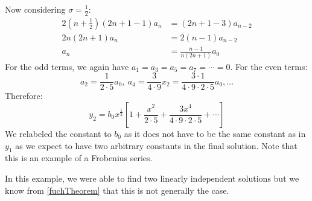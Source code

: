 \documentclass[../main.tex]{subfiles}
\begin{document}
\begin{example}
  Now considering $\sigma = \frac{1}{2}$:
  \begin{align*}
    2\left(n + \frac{1}{2}\right)(2n + 1 - 1)a_n &= (2n + 1 - 3)a_{n -2} \\
    2n(2n + 1)a_n &= 2(n-1)a_{n-2}\\
    a_n &= \frac{n - 1}{n(2n  + 1)}a_0
  \end{align*}
  For the odd terms, we again have $a_1 = a_3 = a_5 = a_7 = \cdots = 0$.
  For the even terms:
  \[
    a_2 = \frac{1}{2 \cdot 5}a_0,\ a_4 = \frac{3}{4 \cdot 9}x_2 = \frac{3 \cdot 1}{4 \cdot 9 \cdot 2 \cdot 5}a_0, \ldots
  \]
  Therefore:
  \[
    y_2 = b_0x^{\frac{1}{2}}\left[1 + \frac{x^2}{2 \cdot 5} + \frac{3x^4}{4 \cdot 9 \cdot 2 \cdot 5} + \cdots\right]
  \]
  We relabeled the constant to $b_0$ as it does not have to be the same constant as in $y_1$ as we expect to have two arbitrary constants in the final solution.
  Note that this is an example of a Frobenius series.
\end{example}
\begin{remark}[Note]
  In this example, we were able to find two linearly independent solutions but we know from \cref{fuchTheorem} that this is not generally the case.
\end{remark}
\end{document}
